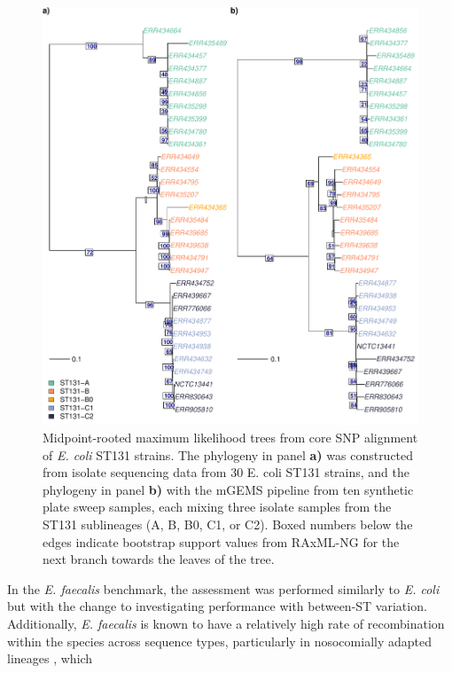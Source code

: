 \documentclass[officiallayout]{tktla}
\let\svthefootnote\thefootnote
\begin{document}
\addtocounter{footnote}{-1}\let\thefootnote\svthefootnote
\begin{figure}[!ht]
    \centering
    \includegraphics[height=0.70\textheight,width=\textwidth,keepaspectratio]{img/reproduced/MGen2021_mGEMS_Figure_4.pdf}
    \caption{Midpoint-rooted maximum likelihood trees from core SNP
      alignment of \textit{E. coli} ST131 strains. The phylogeny in
      panel \textbf{a)} was constructed from isolate sequencing data
      from 30 E. coli ST131 strains, and the phylogeny in panel
      \textbf{b)} with the mGEMS pipeline from ten synthetic plate
      sweep samples, each mixing three isolate samples from the ST131
      sublineages (A, B, B0, C1, or C2). Boxed numbers below the edges
      indicate bootstrap support values from RAxML-NG for the next
      branch towards the leaves of the tree.}
  \label{fig:mgems-ecoli-phylogeny}
\end{figure}
In the \textit{E. faecalis} benchmark, the assessment was performed
similarly to \textit{E. coli} but with the change to investigating
performance with between-ST variation. Additionally,
\textit{E. faecalis} is known to have a relatively high rate of
recombination within the species across sequence types, particularly
in nosocomially adapted lineages \citep{pontinen2021apparent}, which
\end{document}
